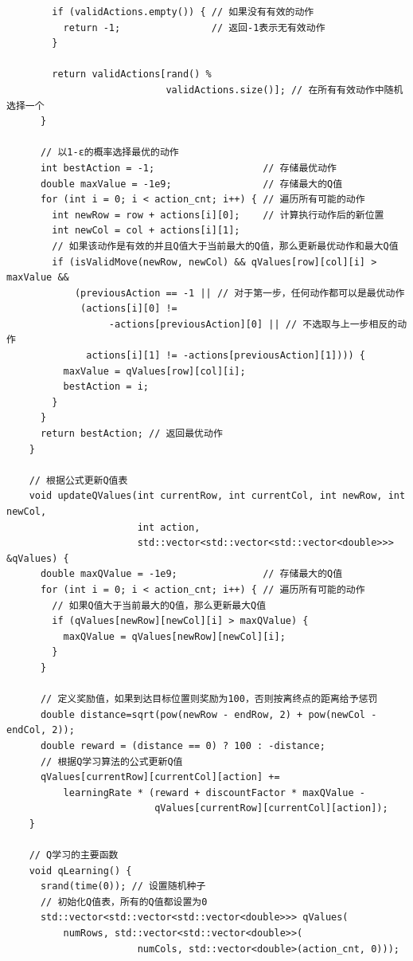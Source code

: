 \documentclass[UTF8,titlepage]{ctexart}
\numberwithin{figure}{section}
\begin{document}
\begin{verbatim}
        if (validActions.empty()) { // 如果没有有效的动作
          return -1;                // 返回-1表示无有效动作
        }
    
        return validActions[rand() %
                            validActions.size()]; // 在所有有效动作中随机选择一个
      }
    
      // 以1-ε的概率选择最优的动作
      int bestAction = -1;                   // 存储最优动作
      double maxValue = -1e9;                // 存储最大的Q值
      for (int i = 0; i < action_cnt; i++) { // 遍历所有可能的动作
        int newRow = row + actions[i][0];    // 计算执行动作后的新位置
        int newCol = col + actions[i][1];
        // 如果该动作是有效的并且Q值大于当前最大的Q值，那么更新最优动作和最大Q值
        if (isValidMove(newRow, newCol) && qValues[row][col][i] > maxValue &&
            (previousAction == -1 || // 对于第一步，任何动作都可以是最优动作
             (actions[i][0] !=
                  -actions[previousAction][0] || // 不选取与上一步相反的动作
              actions[i][1] != -actions[previousAction][1]))) {
          maxValue = qValues[row][col][i];
          bestAction = i;
        }
      }
      return bestAction; // 返回最优动作
    }
    
    // 根据公式更新Q值表
    void updateQValues(int currentRow, int currentCol, int newRow, int newCol,
                       int action,
                       std::vector<std::vector<std::vector<double>>> &qValues) {
      double maxQValue = -1e9;               // 存储最大的Q值
      for (int i = 0; i < action_cnt; i++) { // 遍历所有可能的动作
        // 如果Q值大于当前最大的Q值，那么更新最大Q值
        if (qValues[newRow][newCol][i] > maxQValue) {
          maxQValue = qValues[newRow][newCol][i];
        }
      }
    
      // 定义奖励值，如果到达目标位置则奖励为100，否则按离终点的距离给予惩罚
      double distance=sqrt(pow(newRow - endRow, 2) + pow(newCol - endCol, 2));
      double reward = (distance == 0) ? 100 : -distance;
      // 根据Q学习算法的公式更新Q值
      qValues[currentRow][currentCol][action] +=
          learningRate * (reward + discountFactor * maxQValue -
                          qValues[currentRow][currentCol][action]);
    }
    
    // Q学习的主要函数
    void qLearning() {
      srand(time(0)); // 设置随机种子
      // 初始化Q值表，所有的Q值都设置为0
      std::vector<std::vector<std::vector<double>>> qValues(
          numRows, std::vector<std::vector<double>>(
                       numCols, std::vector<double>(action_cnt, 0)));
    

\end{verbatim}
\end{document}
